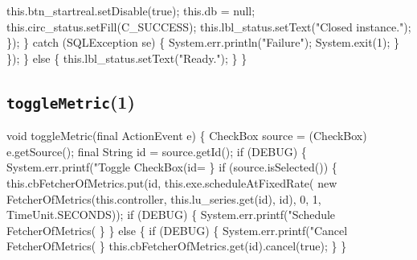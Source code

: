           this.btn_startreal.setDisable(true);
          this.db = null;
          this.circ_status.setFill(C_SUCCESS);
          this.lbl_status.setText("Closed instance.");
        \});
      \} catch (SQLException se) \{
        System.err.println("Failure");
        System.exit(1);
      \}
    \});
  \} else \{
    this.lbl_status.setText("Ready.");
  \}
\}
\eatline
{}\nwendcode{}\nwdocspar
\subsection{\texttt{toggleMetric}(1)}
\nwenddocs{}\endmoddef{}
void toggleMetric(final ActionEvent e) \{
  CheckBox source = (CheckBox) e.getSource();
  final String id = source.getId();
  if (DEBUG) \{
    System.err.printf("Toggle CheckBox(id=%
  \}
  if (source.isSelected()) \{
    this.cbFetcherOfMetrics.put(id, this.exe.scheduleAtFixedRate(
        new FetcherOfMetrics(this.controller, this.lu_series.get(id), id), 0, 1, TimeUnit.SECONDS));
    if (DEBUG) \{
      System.err.printf("Schedule FetcherOfMetrics(%
    \}
  \} else \{
    if (DEBUG) \{
      System.err.printf("Cancel FetcherOfMetrics(%
    \}
    this.cbFetcherOfMetrics.get(id).cancel(true);
  \}
\}
\eatline
{}\nwendcode{}\nwdocspar
